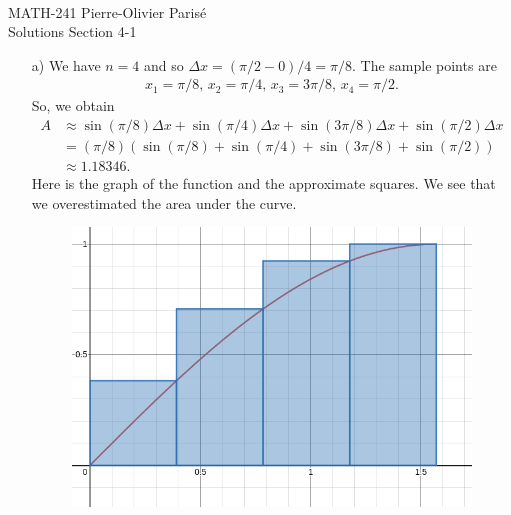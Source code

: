 


	\noindent \hrulefill \\
	MATH-241 \hfill Pierre-Olivier Paris{\'e}\\
	Solutions Section 4-1 \hfill \semester \\\vspace*{-1cm}
	
	\noindent\hrulefill
	
	\spc

	\begin{enumerate}
	\item[a)] We have $n = 4$ and so $\Delta x = (\pi/2 - 0)/4 = \pi/8$. The sample points are
		\begin{align*}
		x_1 = \pi/8 , \, x_2 = \pi/4 , \, x_3 = 3\pi/8 , \, x_4 = \pi/2 .
		\end{align*}
	So, we obtain
		\begin{align*}
		A &\approx \sin (\pi/8) \Delta x + \sin (\pi/4) \Delta x + \sin (3\pi/8) \Delta x + \sin (\pi/2 ) \Delta x \\
		& = (\pi/8) (\sin (\pi/8) + \sin (\pi/4) + \sin (3\pi/8) + \sin (\pi/2) ) \\
		& \approx 1.18346 .
		\end{align*}
	Here is the graph of the function and the approximate squares. We see that we overestimated the area under the curve.
		\begin{figure}[ht]
		\centering
		\includegraphics[scale=0.3]{RiemannSums.png}
		\end{figure}
	

\end{enumerate}
